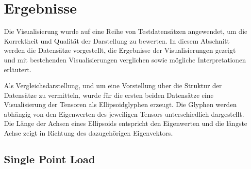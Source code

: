\documentclass[a4paper,fontsize=12pt,toc=bib,halfparskip]{scrartcl}
\begin{document}
\section{Ergebnisse}
\label{sec:Ergebnisse}
Die Visualisierung wurde auf eine Reihe von Testdatens\"atzen angewendet, um die Korrektheit und Qualit\"at der Darstellung zu bewerten. In diesem Abschnitt werden die Datens\"atze vorgestellt, die Ergebnisse der Visualisierungen gezeigt und mit bestehenden Visualisierungen verglichen sowie m\"ogliche Interpretationen erl\"autert.

Als Vergleichsdarstellung, und um eine Vorstellung \"uber die Struktur der Datens\"atze zu vermitteln, wurde f\"ur die ersten beiden Datens\"atze eine Visualisierung der Tensoren als Ellipsoidglyphen erzeugt. Die Glyphen werden abh\"angig von den Eigenwerten des jeweiligen Tensors unterschiedlich dargestellt. Die L\"ange der Achsen eines Ellipsoids entspricht den Eigenwerten und die l\"angste Achse zeigt in Richtung des dazugeh\"origen Eigenvektors.

\subsection{Single Point Load}
\end{document}
